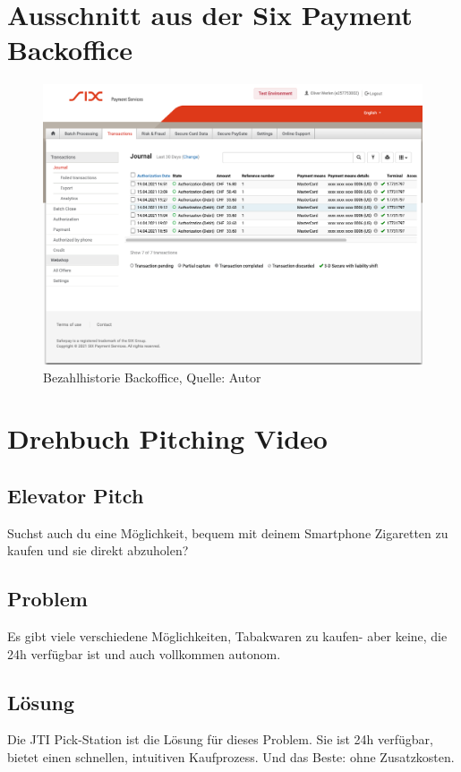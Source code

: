 \section{Ausschnitt aus der Six Payment Backoffice}\label{sixPayment}
\begin{figure}[H]
	\centering
	\includegraphics[width=1\textwidth]{images/paymentsBackoffice.PNG}
	\caption[Bezahlhistorie Backoffice]{Bezahlhistorie Backoffice, Quelle: Autor}
	\label{img: paymentsBackoffice}
\end{figure} 

\section{Drehbuch Pitching Video}
\subsection{Elevator Pitch}
Suchst auch du eine Möglichkeit, bequem mit deinem Smartphone Zigaretten zu kaufen und sie direkt abzuholen? 

\subsection{Problem}
Es gibt viele verschiedene Möglichkeiten, Tabakwaren zu kaufen- aber keine, die 24h verfügbar ist und auch vollkommen autonom.

\subsection{Lösung}
Die JTI Pick-Station ist die Lösung für dieses Problem. Sie ist 24h verfügbar, bietet einen schnellen, intuitiven Kaufprozess. Und das Beste: ohne Zusatzkosten.  


